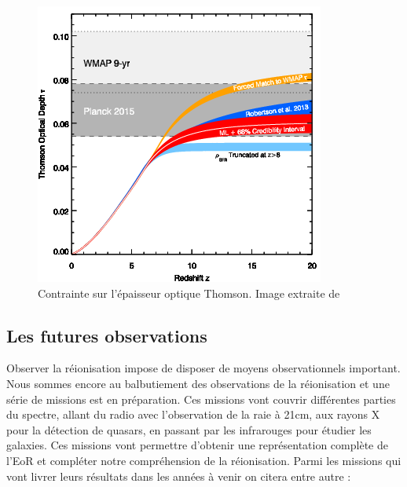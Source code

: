 \begin{figure}
        \includegraphics[width=.9\linewidth]{img/01/epaisseur_optique_thomson.png} 
        \caption[Epaisseur optique Thomson]{%
		Contrainte sur l'épaisseur optique Thomson.
        Image extraite de \cite{2015ApJ...802L..19R}
 		\label{fig:epaisseur_optique_thomson} }
\end{figure}



\subsection{Les futures observations}


Observer la réionisation impose de disposer de moyens observationnels important.
Nous sommes encore au balbutiement des observations de la réionisation et une série de missions est en préparation.
Ces missions vont couvrir différentes parties du spectre, allant du radio avec l'observation de la raie à 21cm, aux rayons X pour la détection de quasars, en passant par les infrarouges pour étudier les galaxies.
Ces missions vont permettre d'obtenir une représentation complète de l'\ac{EoR} et compléter notre compréhension de la réionisation.
Parmi les missions qui vont livrer leurs résultats dans les années à venir on citera entre autre :

